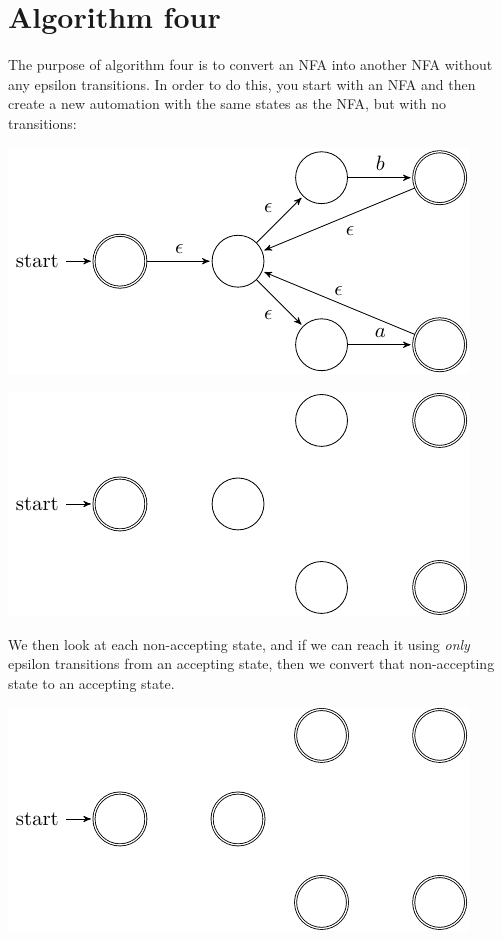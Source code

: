 \section{Algorithm four}

The purpose of algorithm four is to convert an NFA into another NFA without any
epsilon transitions. In order to do this, you start with an NFA and then create
a new automation with the same states as the NFA, but with no transitions:

\begin{center}
  \includegraphics{automata/22.pdf}
\end{center}

\begin{center}
  \includegraphics{automata/23.pdf}
\end{center}

We then look at each non-accepting state, and if we can reach it using {\it
only} epsilon transitions from an accepting state, then we convert that
non-accepting state to an accepting state.

\begin{center}
  \includegraphics{automata/24.pdf}
\end{center}

